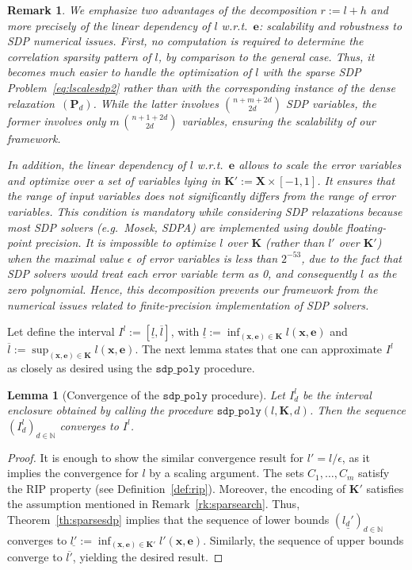 \documentclass[preprint]{sigplanconf}
\newcommand{\N}{\mathbb{N}}
\newcommand{\x}{\mathbf{x}}
\newcommand{\e}{\mathbf{e}}
\def\P{\mathbf{P}}
\def\K{\mathbf{K}}
\def\X{\mathbf{X}}
\newcommand{\sdppolyfun}[3]{\mathtt{sdp\_poly}(#1, #2, #3)}
\newcommand{\sdppoly}{\mathtt{sdp\_poly}}
\newtheorem{lemma}[theorem]{Lemma}
\theoremstyle{plain}
\newtheorem{remark}{Remark}
\begin{document}
%
\begin{remark}
We emphasize two advantages of the decomposition $r := l + h$ and more precisely of the linear dependency of $l$ w.r.t.~$\e$: scalability and robustness to SDP numerical issues.
First, no computation is required to determine the correlation sparsity pattern of $l$, by comparison to the general case. Thus, it becomes much easier to handle the optimization of $l$ with the sparse SDP Problem~\eqref{eq:lscalesdp2} rather than with the corresponding instance of the dense relaxation~$(\P_d)$. While the latter involves $\binom{n + m+ 2 d}{2 d}$ SDP variables, the former involves only $m \, \binom{n + 1 + 2 d}{2 d}$ variables, ensuring the scalability of our framework.

In addition, the linear dependency of $l$ w.r.t.~$\e$ allows to scale the error variables and optimize over a set of variables lying in $\K' := \X \times [-1, 1]$. It ensures that the range of input variables does not significantly differs from the range of error variables. This condition is mandatory while considering SDP relaxations because most SDP solvers (e.g.~{\sc Mosek}, {\sc SDPA}) are implemented using double floating-point precision. It is impossible to optimize $l$ over $\K$ (rather than $l'$ over $\K'$) when the maximal value $\epsilon$ of error variables is less than $2^{-53}$, due to the fact that SDP solvers would treat each error variable term as 0, and consequently $l$ as the zero polynomial. Hence, this decomposition prevents our framework from the numerical issues related to finite-precision implementation of SDP solvers.
\end{remark}
Let define the interval $I^l := [\underline{l}, \overline{l}]$, with $\underline{l} := \inf_{(\x,\e) \in \K} l(\x,\e)$ and $\overline{l} := \sup_{(\x,\e) \in \K} l(\x,\e)$.
The next lemma states that one can approximate $I^l$ as closely as desired using the $\sdppoly$ procedure.
\begin{lemma}[Convergence of the $\sdppoly$ procedure]
\label{th:cvg_sdppoly}
Let $I_d^l$ be the interval enclosure obtained by calling the procedure $\sdppolyfun{l}{\K}{d}$. Then the sequence $(I_d^l)_{d \in \N}$ converges to $I^l$.
\end{lemma}
%
\begin{proof}
It is enough to show the similar convergence result for $l' = l/\epsilon$, as it implies the convergence for $l$ by a scaling argument.
The sets $C_1,\dots, C_m$ satisfy the RIP property (see Definition~\ref{def:rip}). Moreover, the encoding of $\K'$ satisfies the assumption mentioned in Remark~\ref{rk:sparsearch}. Thus, Theorem~\ref{th:sparsesdp} implies that the sequence of lower bounds $(\underline{l_d'})_{d \in \N}$ converges to $\underline{l'} := \inf_{(\x,\e) \in \K'} l'(\x,\e)$. Similarly, the sequence of upper bounds converge to $\overline{l'}$, yielding the desired result.
\end{proof}
\end{document}
